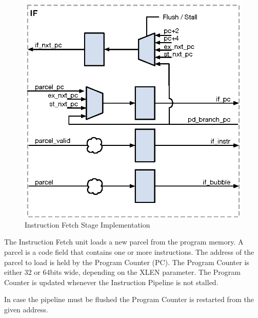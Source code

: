 \begin{figure}[h]
  \includegraphics{assets/img/Pipeline-IF}
  \caption{Instruction Fetch Stage Implementation}
\end{figure}

The Instruction Fetch unit loads a new parcel from the program memory.
A parcel is a code field that contains one or more instructions.
The address of the parcel to load is held by the Program Counter (PC).
The Program Counter is either 32 or 64bits wide, depending on the XLEN parameter.
The Program Counter is updated whenever the Instruction Pipeline is not stalled.

In case the pipeline must be flushed the Program Counter is restarted from the given address.

